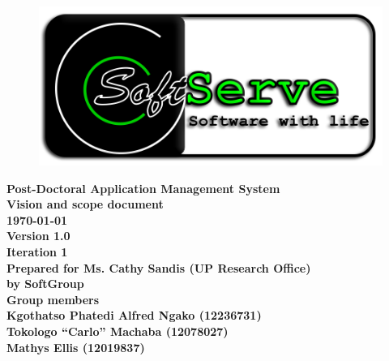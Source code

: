 \documentclass[12pt]{article}
\newcommand{\Title}{Vision and scope document} %
\newcommand{\ssr}{Soft\color{green}{Serve }\color{black}}
\newcommand{\version}{1.0}
\newcommand{\iteration}{1}
\newcommand{\client}{Ms. Cathy Sandis (UP Research Office)}
\newcommand{\project}{Post-Doctoral Application Management System}
\begin{document}
\vspace{4em}

\begin{center}%

\begin{figure}[ht!]
\centering
\includegraphics{../Images_Docs/logo.png}
\end{figure}
\LARGE \bf \project \\[1em]
\LARGE \bf \Title \\[0.25em]
\large \bf \today\\
\bf Version \version\\
\bf Iteration \iteration\\[0.5em]
\Large \bf Prepared for \client\\
\Large \bf by
\Large {\bf \ssr Group }\\[0.5em]
\LARGE {\bf Group members}\\[0.25em]
\large
Kgothatso Phatedi Alfred Ngako (12236731) \\[0.5em]
Tokologo “Carlo” Machaba (12078027) \\[0.5em]
Mathys Ellis (12019837) \\[8em]

\end{center}%

\end{document}
